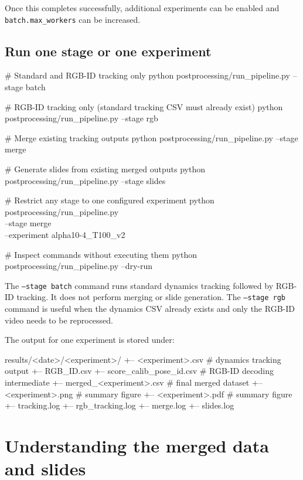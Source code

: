 \documentclass[11pt,a4paper]{article}
\begin{document}
Once this completes successfully, additional experiments can be enabled and \texttt{batch.max\_workers} can be increased.

\subsection{Run one stage or one experiment}

\begin{codeblock}
# Standard and RGB-ID tracking only
python postprocessing/run_pipeline.py --stage batch

# RGB-ID tracking only (standard tracking CSV must already exist)
python postprocessing/run_pipeline.py --stage rgb

# Merge existing tracking outputs
python postprocessing/run_pipeline.py --stage merge

# Generate slides from existing merged outputs
python postprocessing/run_pipeline.py --stage slides

# Restrict any stage to one configured experiment
python postprocessing/run_pipeline.py \\
  --stage merge \\
  --experiment alpha10-4_T100_v2

# Inspect commands without executing them
python postprocessing/run_pipeline.py --dry-run
\end{codeblock}

The \texttt{--stage batch} command runs standard dynamics tracking followed by RGB-ID tracking. It does not perform merging or slide generation. The \texttt{--stage rgb} command is useful when the dynamics CSV already exists and only the RGB-ID video needs to be reprocessed.

The output for one experiment is stored under:

\begin{codeblock}
results/<date>/<experiment>/
+-- <experiment>.csv                  # dynamics tracking output
+-- RGB_ID.csv
+-- score_calib_pose_id.csv          # RGB-ID decoding intermediate
+-- merged_<experiment>.csv          # final merged dataset
+-- <experiment>.png                 # summary figure
+-- <experiment>.pdf                 # summary figure
+-- tracking.log
+-- rgb_tracking.log
+-- merge.log
+-- slides.log
\end{codeblock}

\section{Understanding the merged data and slides}
\end{document}
